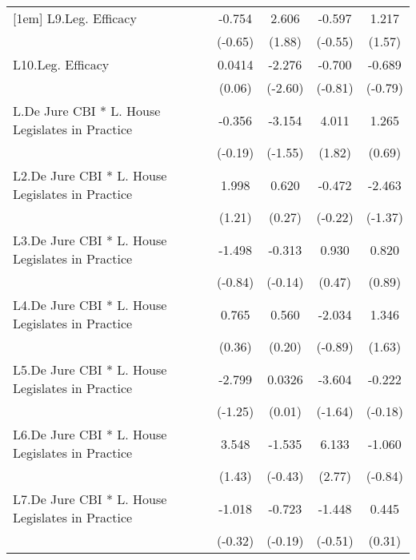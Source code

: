 {\begin{longtable}{l*{4}{c}}
[1em]
L9.Leg. Efficacy&   -0.754         &    2.606         &   -0.597         &    1.217         \\
                &  (-0.65)         &   (1.88)         &  (-0.55)         &   (1.57)         \\
[1em]
L10.Leg. Efficacy&   0.0414         &   -2.276\sym{**} &   -0.700         &   -0.689         \\
                &   (0.06)         &  (-2.60)         &  (-0.81)         &  (-0.79)         \\
[1em]
L.De Jure CBI * L. House Legislates in Practice&   -0.356         &   -3.154         &    4.011         &    1.265         \\
                &  (-0.19)         &  (-1.55)         &   (1.82)         &   (0.69)         \\
[1em]
L2.De Jure CBI * L. House Legislates in Practice&    1.998         &    0.620         &   -0.472         &   -2.463         \\
                &   (1.21)         &   (0.27)         &  (-0.22)         &  (-1.37)         \\
[1em]
L3.De Jure CBI * L. House Legislates in Practice&   -1.498         &   -0.313         &    0.930         &    0.820         \\
                &  (-0.84)         &  (-0.14)         &   (0.47)         &   (0.89)         \\
[1em]
L4.De Jure CBI * L. House Legislates in Practice&    0.765         &    0.560         &   -2.034         &    1.346         \\
                &   (0.36)         &   (0.20)         &  (-0.89)         &   (1.63)         \\
[1em]
L5.De Jure CBI * L. House Legislates in Practice&   -2.799         &   0.0326         &   -3.604         &   -0.222         \\
                &  (-1.25)         &   (0.01)         &  (-1.64)         &  (-0.18)         \\
[1em]
L6.De Jure CBI * L. House Legislates in Practice&    3.548         &   -1.535         &    6.133\sym{**} &   -1.060         \\
                &   (1.43)         &  (-0.43)         &   (2.77)         &  (-0.84)         \\
[1em]
L7.De Jure CBI * L. House Legislates in Practice&   -1.018         &   -0.723         &   -1.448         &    0.445         \\
                &  (-0.32)         &  (-0.19)         &  (-0.51)         &   (0.31)         \\

\end{longtable}}
